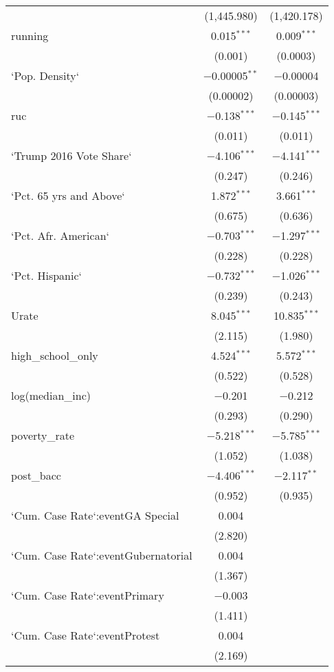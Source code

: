 \begin{table}[!htbp]
\begin{tabular}{@{\extracolsep{5pt}}lcc}
  & (1,445.980) & (1,420.178) \\ 
  running & 0.015$^{***}$ & 0.009$^{***}$ \\ 
  & (0.001) & (0.0003) \\ 
  `Pop. Density` & $-$0.00005$^{**}$ & $-$0.00004 \\ 
  & (0.00002) & (0.00003) \\ 
  ruc & $-$0.138$^{***}$ & $-$0.145$^{***}$ \\ 
  & (0.011) & (0.011) \\ 
  `Trump 2016 Vote Share` & $-$4.106$^{***}$ & $-$4.141$^{***}$ \\ 
  & (0.247) & (0.246) \\ 
  `Pct. 65 yrs and Above` & 1.872$^{***}$ & 3.661$^{***}$ \\ 
  & (0.675) & (0.636) \\ 
  `Pct. Afr. American` & $-$0.703$^{***}$ & $-$1.297$^{***}$ \\ 
  & (0.228) & (0.228) \\ 
  `Pct. Hispanic` & $-$0.732$^{***}$ & $-$1.026$^{***}$ \\ 
  & (0.239) & (0.243) \\ 
  Urate & 8.045$^{***}$ & 10.835$^{***}$ \\ 
  & (2.115) & (1.980) \\ 
  high\_school\_only & 4.524$^{***}$ & 5.572$^{***}$ \\ 
  & (0.522) & (0.528) \\ 
  log(median\_inc) & $-$0.201 & $-$0.212 \\ 
  & (0.293) & (0.290) \\ 
  poverty\_rate & $-$5.218$^{***}$ & $-$5.785$^{***}$ \\ 
  & (1.052) & (1.038) \\ 
  post\_bacc & $-$4.406$^{***}$ & $-$2.117$^{**}$ \\ 
  & (0.952) & (0.935) \\ 
  `Cum. Case Rate`:eventGA Special & 0.004 &  \\ 
  & (2.820) &  \\ 
  `Cum. Case Rate`:eventGubernatorial & 0.004 &  \\ 
  & (1.367) &  \\ 
  `Cum. Case Rate`:eventPrimary & $-$0.003 &  \\ 
  & (1.411) &  \\ 
  `Cum. Case Rate`:eventProtest & 0.004 &  \\ 
  & (2.169) &  \\ 

\end{tabular}
\end{table}
